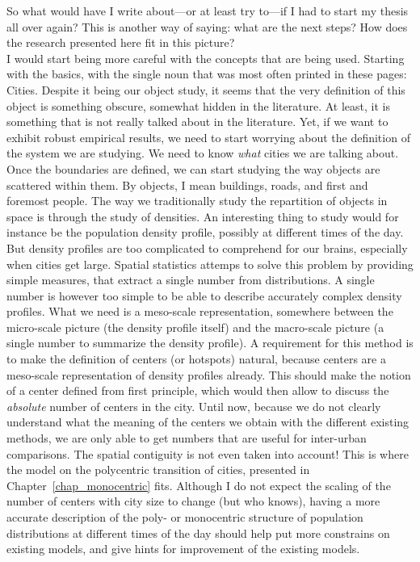 So what would have I write about---or at least try to---if I had to start my
thesis all over again? This is another way of saying: what are the next steps?
How does the research presented here fit in this picture?\\

I would start being more careful with the concepts that are being used. Starting
with the basics, with the single noun that was most often printed in these
pages: Cities. Despite it being our object study, it seems that the very
definition of this object is something obscure, somewhat hidden in the
literature. At least, it is something that is not really talked about in the
literature. Yet, if we want to exhibit robust empirical results, we need to
start worrying about the definition of the system we are studying. We need to
know \emph{what} cities we are talking about.\\

Once the boundaries are defined, we can start studying the way objects are
scattered within them. By objects, I mean buildings, roads, and first and
foremost people. The way we traditionally study the repartition of objects in
space is through the study of densities. An interesting thing to study would for
instance be the population density profile, possibly at different times of the
day. But density profiles are too complicated to comprehend for our brains,
especially when cities get large. Spatial statistics attemps to solve this
problem by providing simple measures, that extract a single number from
distributions. A single number is however too simple to be able to describe
accurately complex density profiles. What we need is a meso-scale
representation, somewhere between the micro-scale picture (the density profile
itself) and the macro-scale picture (a single number to summarize the density
profile). A requirement for this method is to make the definition of centers (or
hotspots) natural, because centers are a meso-scale representation of density
profiles already. This should make the notion of a center defined from first
principle, which would then allow to discuss the \emph{absolute} number of
centers in the city. Until now, because we do not clearly understand what the
meaning of the centers we obtain with the different existing methods, we are
only able to get numbers that are useful for inter-urban comparisons. The
spatial contiguity is not even taken into account!
This is where the model on the polycentric transition of cities, presented in
Chapter~\ref{chap_monocentric} fits. Although I do not expect the scaling of the
number of centers with city size to change (but who knows), having a more
accurate description of the poly- or monocentric structure of population
distributions at different times of the day should help put more constrains on
existing models, and give hints for improvement of the existing models.\\


